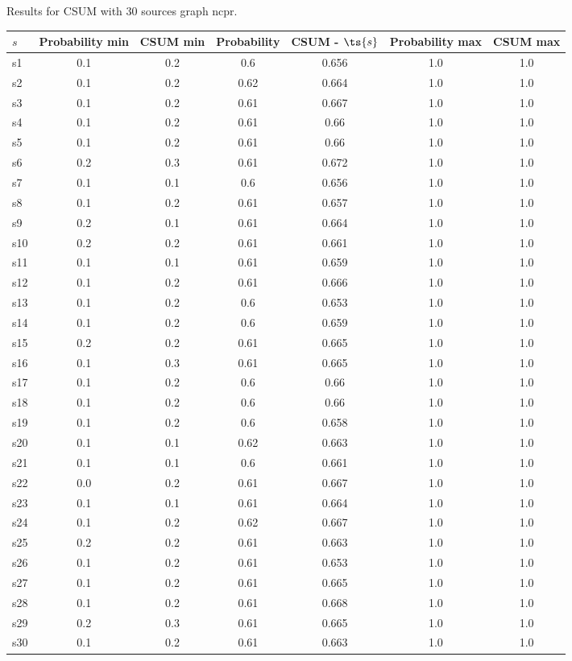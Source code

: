 \documentclass{article}
\begin{document}
\noindent Results for CSUM with 30 sources graph ncpr.

\noindent\begin{tabular}{|l|c|c|c|c|c|c|}
\hline
$s$& Probability min & CSUM min & Probability & CSUM - $\ts{s}$ & Probability max & CSUM max\\
\hline
s1 &0.1 & 0.2 & 0.6 & 0.656 & 1.0 & 1.0\\
\hline
s2 &0.1 & 0.2 & 0.62 & 0.664 & 1.0 & 1.0\\
\hline
s3 &0.1 & 0.2 & 0.61 & 0.667 & 1.0 & 1.0\\
\hline
s4 &0.1 & 0.2 & 0.61 & 0.66 & 1.0 & 1.0\\
\hline
s5 &0.1 & 0.2 & 0.61 & 0.66 & 1.0 & 1.0\\
\hline
s6 &0.2 & 0.3 & 0.61 & 0.672 & 1.0 & 1.0\\
\hline
s7 &0.1 & 0.1 & 0.6 & 0.656 & 1.0 & 1.0\\
\hline
s8 &0.1 & 0.2 & 0.61 & 0.657 & 1.0 & 1.0\\
\hline
s9 &0.2 & 0.1 & 0.61 & 0.664 & 1.0 & 1.0\\
\hline
s10 &0.2 & 0.2 & 0.61 & 0.661 & 1.0 & 1.0\\
\hline
s11 &0.1 & 0.1 & 0.61 & 0.659 & 1.0 & 1.0\\
\hline
s12 &0.1 & 0.2 & 0.61 & 0.666 & 1.0 & 1.0\\
\hline
s13 &0.1 & 0.2 & 0.6 & 0.653 & 1.0 & 1.0\\
\hline
s14 &0.1 & 0.2 & 0.6 & 0.659 & 1.0 & 1.0\\
\hline
s15 &0.2 & 0.2 & 0.61 & 0.665 & 1.0 & 1.0\\
\hline
s16 &0.1 & 0.3 & 0.61 & 0.665 & 1.0 & 1.0\\
\hline
s17 &0.1 & 0.2 & 0.6 & 0.66 & 1.0 & 1.0\\
\hline
s18 &0.1 & 0.2 & 0.6 & 0.66 & 1.0 & 1.0\\
\hline
s19 &0.1 & 0.2 & 0.6 & 0.658 & 1.0 & 1.0\\
\hline
s20 &0.1 & 0.1 & 0.62 & 0.663 & 1.0 & 1.0\\
\hline
s21 &0.1 & 0.1 & 0.6 & 0.661 & 1.0 & 1.0\\
\hline
s22 &0.0 & 0.2 & 0.61 & 0.667 & 1.0 & 1.0\\
\hline
s23 &0.1 & 0.1 & 0.61 & 0.664 & 1.0 & 1.0\\
\hline
s24 &0.1 & 0.2 & 0.62 & 0.667 & 1.0 & 1.0\\
\hline
s25 &0.2 & 0.2 & 0.61 & 0.663 & 1.0 & 1.0\\
\hline
s26 &0.1 & 0.2 & 0.61 & 0.653 & 1.0 & 1.0\\
\hline
s27 &0.1 & 0.2 & 0.61 & 0.665 & 1.0 & 1.0\\
\hline
s28 &0.1 & 0.2 & 0.61 & 0.668 & 1.0 & 1.0\\
\hline
s29 &0.2 & 0.3 & 0.61 & 0.665 & 1.0 & 1.0\\
\hline
s30 &0.1 & 0.2 & 0.61 & 0.663 & 1.0 & 1.0\\
\hline
\end{tabular}\\
\end{document}
